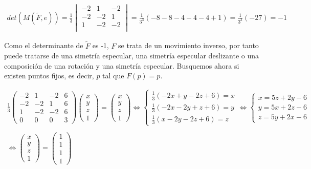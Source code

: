 \begin{gather*}
    det(M(\widetilde{F},e)) = \frac{1}{3}
    \begin{vmatrix}
    -2 & 1 & -2 \\
    -2 & -2 & 1 \\
    1 & -2 & -2 \\
    \end{vmatrix}
    = \frac{1}{3^3}(-8-8-4-4-4+1) =\frac{1}{3^3}(-27) = -1
\end{gather*}

Como el determinante de $\widetilde{F}$ es -1, $F$ se trata de un movimiento inverso, por tanto puede tratarse de una simetría especular, una simetría especular deslizante o una composición de una rotación y una simetría especular. Busquemos ahora si existen puntos fijos, es decir, $p$ tal que $F(p) = p$.

\begin{gather*}
    \frac{1}{3}\begin{pmatrix}
    -2 & 1 & -2 & 6\\
    -2 & -2 & 1 & 6\\
    1 & -2 & -2 & 6\\
    0 & 0 & 0 & 3
    \end{pmatrix}
    \begin{pmatrix}
    x\\y\\z\\1
    \end{pmatrix}
    =
    \begin{pmatrix}
    x\\y\\z\\1
    \end{pmatrix}
    \Longleftrightarrow
    \begin{cases}
    \frac{1}{3}(-2x + y -2z + 6) = x\\ \frac{1}{3}(-2x-2y+z+6) =y\\ \frac{1}{3}(x-2y-2z+6)=z    
    \end{cases}
    \Longleftrightarrow
    \begin{cases}
    x = 5z + 2y -6\\ y = 5x + 2z - 6\\ z = 5y +2x -6
    \end{cases}
    \\
    \\
    \Longleftrightarrow
    \begin{pmatrix}
    x\\y\\z\\1
    \end{pmatrix}
    =
    \begin{pmatrix}
    1\\1\\1\\1
    \end{pmatrix}
\end{gather*}

